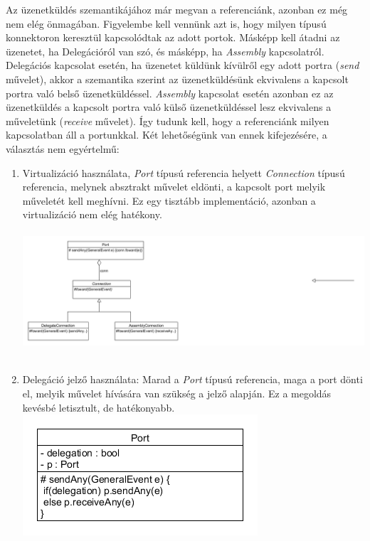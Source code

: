 \documentclass[a4paper,12pt]{report}
\begin{document}
Az üzenetküldés szemantikájához már megvan a referenciánk, azonban ez még nem elég önmagában. Figyelembe kell vennünk azt is, hogy milyen típusú konnektoron keresztül kapcsolódtak az adott portok. Másképp kell átadni az üzenetet, ha Delegációról van szó, és másképp, ha \textit{Assembly} kapcsolatról. Delegációs kapcsolat esetén, ha üzenetet küldünk kívülről egy adott portra (\textit{send} művelet), akkor a szemantika szerint az üzenetküldésünk ekvivalens a kapcsolt portra való belső üzenetküldéssel. \textit{Assembly} kapcsolat esetén azonban ez az üzenetküldés a kapcsolt portra való külső üzenetküldéssel lesz ekvivalens a műveletünk (\textit{receive} művelet). Így tudunk kell, hogy a referenciánk milyen kapcsolatban áll a portunkkal. Két lehetőségünk van ennek kifejezésére, a választás nem egyértelmű:
\begin{enumerate}
\item Virtualizáció használata, \textit{Port} típusú referencia helyett \textit{Connection} típusú referencia, melynek absztrakt művelet eldönti, a kapcsolt port melyik műveletét kell meghívni. Ez egy tisztább implementáció, azonban a virtualizáció nem elég hatékony. \\\\
\includegraphics[scale=0.7]{connection.png} \\ \\
\item Delegáció jelző használata: Marad a \textit{Port} típusú referencia, maga a port dönti el, melyik művelet hívására van szükség a jelző alapján. Ez a megoldás kevésbé letisztult, de hatékonyabb. \\
\includegraphics[scale=0.9]{connection_with_flag.png}

\end{enumerate}
\end{document}
